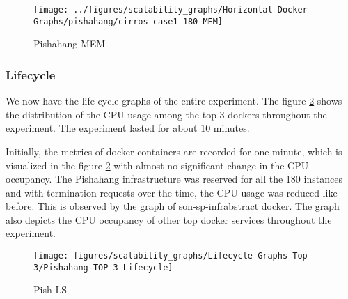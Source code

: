 \begin{figure}[h]
	\centering
	\texttt{[image: ../figures/scalability\_graphs/Horizontal-Docker-Graphs/pishahang/cirros\_case1\_180-MEM]}
	\caption{Pishahang MEM}
	\label{fig:pishcirroscase1180-mem}
\end{figure}
\pagebreak

\subsubsection{Lifecycle}

We now have the life cycle graphs of the entire experiment. The figure \ref{fig:pishahang-top-3-lifecycle} shows the distribution of the CPU usage among the top 3 dockers throughout the experiment. The experiment lasted for about 10 minutes.

Initially, the metrics of docker containers are recorded for one minute, which is visualized in  the figure \ref{fig:pishahang-top-3-lifecycle} with almost no significant change in the CPU occupancy. The Pishahang infrastructure was reserved for all the 180 instances and with termination requests over the time, the CPU usage was reduced like before. This is observed by the graph of son-sp-infrabstract docker. The graph also depicts the CPU occupancy of other top docker services throughout the experiment.


\begin{figure}[h]
	\centering
	\texttt{[image: figures/scalability\_graphs/Lifecycle-Graphs-Top-3/Pishahang-TOP-3-Lifecycle]}
	\caption{Pish LS}
	\label{fig:pishahang-top-3-lifecycle}
\end{figure}
